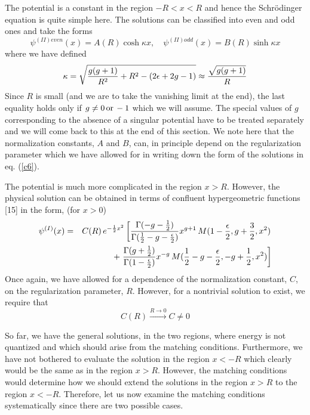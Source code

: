 \documentclass[a4paper,11pt]{article}
\begin{document}
The potential is a constant in the region $-R<x<R$ and hence the
Schr\"{o}dinger equation is quite simple here. The solutions can be
classified into even and odd ones and take the forms
\begin{equation}
\psi^{(II)even}(x) = A(R) \cosh \kappa x,\quad
\psi^{(II)odd}(x)  = B(R) \sinh \kappa x\label{c6}
\end{equation}
where we have defined
\begin{equation}
\kappa = \sqrt{{g(g+1)\over R^{2}}+R^{2}-(2\epsilon + 2g - 1)}\approx
{\sqrt{g(g+1)}\over R}\label{c7}
\end{equation}
Since $R$ is small (and we are to take the vanishing limit at the
end), the last equality holds only if $g\neq 0\,{\rm or}\, -1$ which we will
assume. The special values of $g$ corresponding to the absence of a
singular potential have to be treated separately and we will come back
to this at the end of this section. We note here that the
normalization constants, $A$ and $B$, can, in principle depend on the
regularization parameter which we have allowed for in writing down the
form of the solutions in eq. (\ref{c6}).

The potential is much more complicated in the region $x>R$. However,
the physical solution can be obtained in terms of confluent
hypergeometric functions [15] in the form, (for $x>0$) 
\begin{eqnarray}
\psi^{(I)}(x) & = & C(R)\,e^{-{1\over
2}x^{2}}\left[\frac{\Gamma(-g-{1\over 2})}{\Gamma({1\over
2}-g-{\epsilon\over 2})}x^{g+1}\,M(1-{\epsilon\over 2},g+{3\over
2},x^{2})\right.\nonumber\\
 &  &+\left. \frac{\Gamma(g+{1\over 2})}{\Gamma(1-{\epsilon\over
2})}x^{-g}\,M({1\over 2}-g-{\epsilon\over 2},-g+{1\over
2},x^{2})\right]\label{c14}
\end{eqnarray}
Once again, we have allowed for a dependence of the normalization
constant, $C$, on the regularization parameter, $R$. However, for a
nontrivial solution to exist, we require that
\[
C(R)\stackrel{R\rightarrow 0}{\longrightarrow} C\neq 0
\]

So far, we have the general solutions, in the two regions, where
energy  is not quantized and 
which should arise from the matching conditions. Furthermore, we have
not bothered to evaluate the solution in the region $x<-R$ which
clearly would be the same as in the region $x>R$. However, the
matching conditions would determine  how we should extend the solutions
in the region $x>R$ to the region $x<-R$. Therefore, let us now
examine the matching conditions systematically since there are two
possible  cases.
\end{document}
